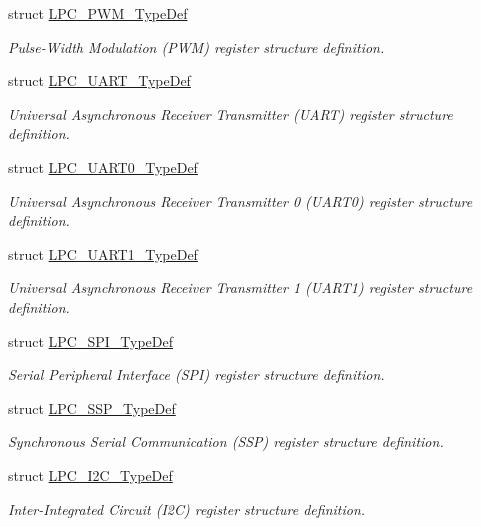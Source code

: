 \begin{DoxyCompactItemize}
struct \hyperlink{struct_l_p_c___p_w_m___type_def}{\-L\-P\-C\-\_\-\-P\-W\-M\-\_\-\-Type\-Def}
\begin{DoxyCompactList}\small\item\em \-Pulse-\/\-Width \-Modulation (\-P\-W\-M) register structure definition. \end{DoxyCompactList}\item 
struct \hyperlink{struct_l_p_c___u_a_r_t___type_def}{\-L\-P\-C\-\_\-\-U\-A\-R\-T\-\_\-\-Type\-Def}
\begin{DoxyCompactList}\small\item\em \-Universal \-Asynchronous \-Receiver \-Transmitter (\-U\-A\-R\-T) register structure definition. \end{DoxyCompactList}\item 
struct \hyperlink{struct_l_p_c___u_a_r_t0___type_def}{\-L\-P\-C\-\_\-\-U\-A\-R\-T0\-\_\-\-Type\-Def}
\begin{DoxyCompactList}\small\item\em \-Universal \-Asynchronous \-Receiver \-Transmitter 0 (\-U\-A\-R\-T0) register structure definition. \end{DoxyCompactList}\item 
struct \hyperlink{struct_l_p_c___u_a_r_t1___type_def}{\-L\-P\-C\-\_\-\-U\-A\-R\-T1\-\_\-\-Type\-Def}
\begin{DoxyCompactList}\small\item\em \-Universal \-Asynchronous \-Receiver \-Transmitter 1 (\-U\-A\-R\-T1) register structure definition. \end{DoxyCompactList}\item 
struct \hyperlink{struct_l_p_c___s_p_i___type_def}{\-L\-P\-C\-\_\-\-S\-P\-I\-\_\-\-Type\-Def}
\begin{DoxyCompactList}\small\item\em \-Serial \-Peripheral \-Interface (\-S\-P\-I) register structure definition. \end{DoxyCompactList}\item 
struct \hyperlink{struct_l_p_c___s_s_p___type_def}{\-L\-P\-C\-\_\-\-S\-S\-P\-\_\-\-Type\-Def}
\begin{DoxyCompactList}\small\item\em \-Synchronous \-Serial \-Communication (\-S\-S\-P) register structure definition. \end{DoxyCompactList}\item 
struct \hyperlink{struct_l_p_c___i2_c___type_def}{\-L\-P\-C\-\_\-\-I2\-C\-\_\-\-Type\-Def}
\begin{DoxyCompactList}\small\item\em \-Inter-\/\-Integrated \-Circuit (\-I2\-C) register structure definition. \end{DoxyCompactList}\item 

\end{DoxyCompactItemize}

